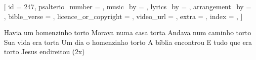 
[
    id                     = {247},
    psalterio_number       = {},
    music_by               = {},
    lyrics_by              = {},
    arrangement_by         = {},
    bible_verse            = {},
    licence_or_copyright   = {},
    video_url              = {},
    extra                  = {},
    index                  = {},
]


\beginchorus

Havia um homenzinho torto 
Morava numa casa torta 
Andava num caminho torto 
Sua vida era torta
Um dia o homenzinho torto 
A bíblia encontrou
E tudo que era torto
Jesus endireitou
(2x)
\endchorus


\endsong

